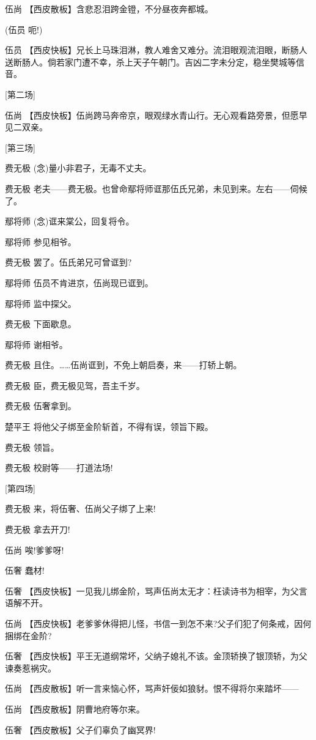 伍尚 【西皮散板】含悲忍泪跨金镫，不分昼夜奔都城。

(伍员 呃!)

伍员
【西皮快板】兄长上马珠泪淋，教人难舍又难分。流泪眼观流泪眼，断肠人送断肠人。倘若家门遭不幸，杀上天子午朝门。吉凶二字未分定，稳坐樊城等信音。

{[}第二场{]}

伍尚
【西皮快板】伍尚跨马奔帝京，眼观绿水青山行。无心观看路旁景，但愿早见二双亲。

{[}第三场{]}

费无极 (念)量小非君子，无毒不丈夫。

费无极
老夫------费无极。也曾命鄢将师诓那伍氏兄弟，未见到来。左右------伺候了。

鄢将师 (念)诓来棠公，回复将令。

鄢将师 参见相爷。

费无极 罢了。伍氏弟兄可曾诓到?

鄢将师 伍员不肯进京，伍尚现已诓到。

鄢将师 监中探父。

费无极 下面歇息。

鄢将师 谢相爷。

费无极 且住。\ldots{}\ldots{}伍尚诓到，不免上朝启奏，来------打轿上朝。

费无极 臣，费无极见驾，吾主千岁。

费无极 伍奢拿到。

楚平王 将他父子绑至金阶斩首，不得有误，领旨下殿。

费无极 领旨。

费无极 校尉等------打道法场!

{[}第四场{]}

费无极 来，将伍奢、伍尚父子绑了上来!

费无极 拿去开刀!

伍尚 唉!爹爹呀!

伍奢 蠢材!

伍奢
【西皮快板】一见我儿绑金阶，骂声伍尚太无才：枉读诗书为相宰，为父言语解不开。

伍尚
【西皮快板】老爹爹休得把儿怪，书信一到怎不来?父子们犯了何条戒，因何捆绑在金阶?

伍奢
【西皮快板】平王无道纲常坏，父纳子媳礼不该。金顶轿换了银顶轿，为父谏奏惹祸灾。

伍尚 【西皮散板】听一言来恼心怀，骂声奸佞如狼豺。恨不得将尔来踏坏------

伍尚 【西皮散板】阴曹地府等尔来。

伍奢 【西皮散板】父子们辜负了幽冥界!

